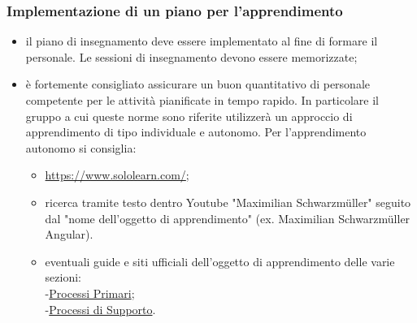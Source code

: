 \subsubsection{Implementazione di un piano per l'apprendimento}
\begin{itemize}
    \item il piano di insegnamento deve essere implementato al fine di formare il personale. Le sessioni di insegnamento devono essere memorizzate;
    \item è fortemente consigliato assicurare un buon quantitativo di personale competente per le attività pianificate in tempo rapido.
    In particolare il gruppo a cui queste norme sono riferite utilizzerà un approccio di apprendimento di tipo individuale e autonomo. Per l'apprendimento autonomo si consiglia:
    \begin{itemize}
        \item \url{https://www.sololearn.com/};
        \item ricerca tramite testo dentro Youtube "Maximilian Schwarzmüller" seguito dal "nome dell'oggetto di apprendimento" (ex. Maximilian Schwarzmüller Angular).
        \item eventuali guide e siti ufficiali dell'oggetto di apprendimento delle varie sezioni:\\
        \hypersetup{
            linkcolor=blue
        }
        -\hyperlink{ProcessiPrimari}{Processi Primari};\\
        -\hyperlink{ProcessiSupporto}{Processi di Supporto}.
    \end{itemize}
\end{itemize}


